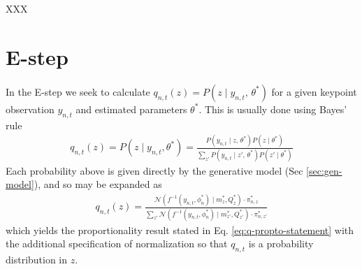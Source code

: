 \documentclass{article}         %
\newcommand{\NN}{\mathcal{N}}
\begin{document}
XXX


\section{E-step}

In the E-step we seek to calculate $q_{n, t}(z) = P(z\mid y_{n, t},\,\theta^*)$ for a given keypoint observation $y_{n, t}$ and estimated parameters $\theta^*$. This is usually done using Bayes' rule
\begin{align}
    q_{n,t}(z) = P(z\mid y_{n, t}, \theta^*) = \frac{P(y_{n, t}\mid z,\,\theta^*)P(z\mid \theta^*)}{\sum_{z'} P(y_{n, t}\mid z',\,\theta^*)P(z'\mid \theta^*)}
\end{align}
Each probability above is given directly by the generative model (Sec \ref{sec:gen-model}), and so may be expanded as
\begin{align}
    q_{n,t}(z) = \frac{ \NN(f^{-1}(y_{n,t}, \phi^*_n) \mid m_{z}^*, Q_{z}^*) \cdot \pi_{n,z}^* }{ \sum_{z'} \NN(f^{-1}(y_{n,t}, \phi^*_n) \mid m_{z'}^*, Q_{z'}^*) \cdot \pi_{n,z'}^* }
\end{align}
which yields the proportionality result stated in Eq. \ref{eq:q-propto-statement} with the additional specification of normalization so that $q_{n,t}$ is a probability distribution in $z$.
\end{document}
